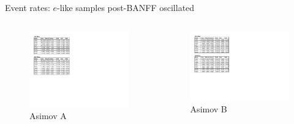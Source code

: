 \documentclass{beamer}
\begin{document}
\begin{frame}{Event rates: $e$-like samples post-BANFF oscillated}
	\centering

	\begin{columns}
		\begin{column}{0.5\paperwidth}
			\begin{figure}
				\includegraphics[page=2, trim={0cm 8cm 13cm 1cm}, clip, scale=0.52] {images/rates/postfit_A}
				\caption{Asimov A}
			\end{figure}
		\end{column}
		\begin{column}{0.5\paperwidth}
			\begin{figure}
				\includegraphics[page=2, trim={0cm 6.5cm 13cm 2.0cm}, clip, scale=0.52] {images/rates/postfit_B}
				\caption{Asimov B}
			\end{figure}
		\end{column}
	\end{columns}
\end{frame}
\end{document}
